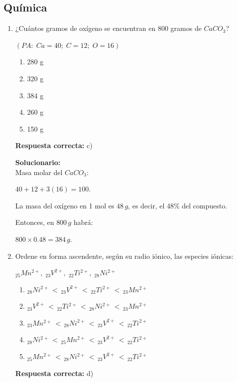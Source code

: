 \subsection*{Química}

\begin{enumerate}

	\item ¿Cuántos gramos de oxígeno se encuentran en 800 gramos de $CaCO_3$?
	
	$(PA:\; Ca=40;\; C=12;\; O=16)$
	\begin{enumerate}[label=\alph*)]
		\item 280 g
		\item 320 g
		\item 384 g
		\item 260 g
		\item 150 g
	\end{enumerate}
	\textbf{Respuesta correcta:} c)
	
	\vspace{2mm}
	\textbf{Solucionario:}\\
	Masa molar del $CaCO_3$:
	
	$40+12+3(16)=100$.
	
	La masa del oxígeno en 1 mol es $48\,g$, es decir, el $48\%$ del compuesto.
	
	Entonces, en $800\,g$ habrá:
	
	$800\times 0.48=384\,g$.
	
	
	\vspace{6mm}
	
	\item Ordene en forma ascendente, según su radio iónico, las especies iónicas:
	
	${}_{25}Mn^{2+},\; {}_{23}V^{2+},\; {}_{22}Ti^{2+},\; {}_{28}Ni^{2+}$
	
	\begin{enumerate}[label=\alph*)]
		\item ${}_{28}Ni^{2+} \,<\, {}_{23}V^{2+} \,<\, {}_{22}Ti^{2+} \,<\, {}_{23}Mn^{2+}$
		\item ${}_{23}V^{2+} \,<\, {}_{22}Ti^{2+} \,<\, {}_{28}Ni^{2+} \,<\, {}_{23}Mn^{2+}$
		\item ${}_{23}Mn^{2+} \,<\, {}_{28}Ni^{2+} \,<\, {}_{23}V^{2+} \,<\, {}_{22}Ti^{2+}$
		\item ${}_{28}Ni^{2+} \,<\, {}_{25}Mn^{2+} \,<\, {}_{23}V^{2+} \,<\, {}_{22}Ti^{2+}$
		\item ${}_{25}Mn^{2+} \,<\, {}_{28}Ni^{2+} \,<\, {}_{23}V^{2+} \,<\, {}_{22}Ti^{2+}$
	\end{enumerate}
	\textbf{Respuesta correcta:} d)
	

\end{enumerate}
